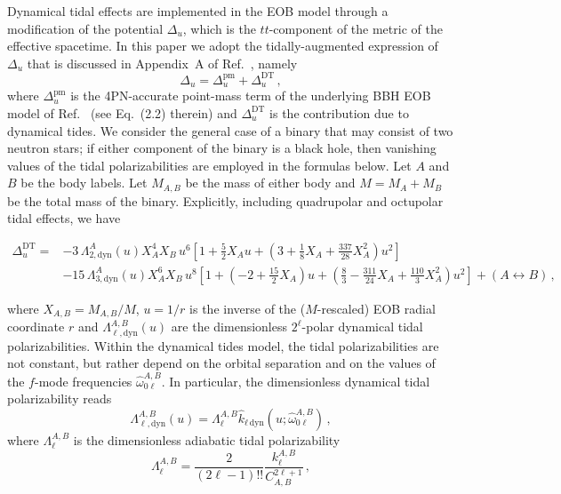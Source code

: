\documentclass[prd,aps,letter,twocolumn,floatfix,notitlepage,nofootinbib]{revtex4-1}
\begin{document}
Dynamical tidal effects are implemented in the EOB model through a modification of the potential $\Delta_u$, which is the $tt$-component of the metric of the effective spacetime. In this paper we adopt the tidally-augmented expression of $\Delta_u$ that is discussed in Appendix~A of Ref.~\cite{Steinhoff:2016rfi}, namely
\begin{equation}
\Delta_u = \Delta_u^{\textrm{pm}} + \Delta_u^{\textrm{DT}}\,,
\end{equation}
where $\Delta_u^{\textrm{pm}}$ is the 4PN-accurate point-mass term of the underlying BBH EOB model of Ref.~\cite{Bohe:2016gbl} (see Eq.~(2.2) therein) and $\Delta_u^{\textrm{DT}}$ is the contribution due to dynamical tides. We consider the general case of a binary that may consist of two neutron stars; if either component of the binary is a black hole, then vanishing values of the tidal polarizabilities are employed in the formulas below. Let $A$ and $B$ be the body labels. Let $M_{A,B}$ be the mass of either body and $M=M_A+M_B$ be the total mass of the binary.  Explicitly, including quadrupolar and octupolar tidal effects, we have
\begin{widetext}
\begin{align}
 \Delta_u^{\textrm{DT}} =&  - 3\,\Lambda_{2,\textrm{dyn}}^{A}(u)X_A^4 X_B\,u^6  \left[ 1 + \frac{5}{2} X_Au + \left(3 + \frac{1}{8}X_A + \frac{337}{28} X_A^2\right)u^2 \right]\nonumber\\
 &- 15\,\Lambda_{3,\textrm{dyn}}^{A}(u)X_A^6X_B\,u^8 \left[1 + \left(-2 + \frac{15}{2}X_A\right)u + \left(\frac{8}{3} - \frac{311}{24}X_A + \frac{110}{3}X_A^2\right) u^2\right] + (A \leftrightarrow B)\,,
\end{align}
\end{widetext}
where $X_{A,B}=M_{A,B}/M$, $u=1/r$ is the inverse of the ($M$-rescaled) EOB radial coordinate $r$ and $\Lambda_{\ell,\textrm{dyn}}^{A,B}(u)$ are the dimensionless $2^{\ell}$-polar dynamical tidal polarizabilities. Within the dynamical tides model, the tidal polarizabilities are not constant, but rather depend on the orbital separation and on the values of the $f$-mode frequencies $\hat{\omega}_{0\ell}^{A,B}$. In particular, the dimensionless dynamical tidal polarizability reads
\begin{equation}
\Lambda_{\ell,\textrm{dyn}}^{A,B}(u)=\Lambda_{\ell}^{A,B}\hat{k}_{\ell\,\textrm{dyn}}(u;\hat{\omega}_{0\ell}^{A,B})\,,
\end{equation}
where $\Lambda_{\ell}^{A,B}$ is the dimensionless adiabatic tidal polarizability
\begin{equation}
\Lambda_{\ell}^{A,B}=\frac{2}{(2\ell-1)!!}\frac{k^{A,B}_{\ell}}{C_{A,B}^{2\ell+1}}\,,
\end{equation}
\end{document}
